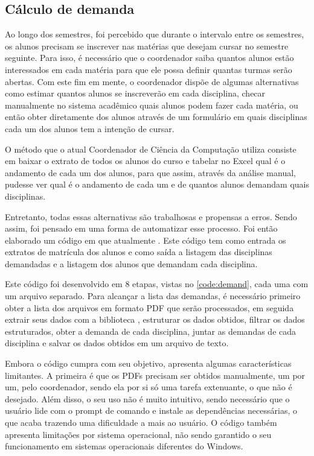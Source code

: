 \subsection{Cálculo de demanda} %

Ao longo dos semestres, foi percebido que durante o intervalo entre os semestres, os alunos precisam se inscrever nas matérias que desejam cursar no semestre seguinte. Para isso, é necessário que o coordenador saiba quantos alunos estão interessados em cada matéria para que ele possa definir quantas turmas serão abertas. Com este fim em mente, o coordenador dispõe de algumas alternativas como estimar quantos alunos se inscreverão em cada disciplina, checar manualmente no sistema acadêmico quais alunos podem fazer cada matéria, ou então obter diretamente dos alunos através de um formulário em quais disciplinas cada um dos alunos tem a intenção de cursar.

O método que o atual Coordenador de Ciência da Computação utiliza consiste em baixar o extrato de todos os alunos do curso e tabelar no Excel qual é o andamento de cada um dos alunos, para que assim, através da análise manual, pudesse ver qual é o andamento de cada um e de quantos alunos demandam quais disciplinas.

Entretanto, todas essas alternativas são trabalhosas e propensas a erros. Sendo assim, foi pensado em uma forma de automatizar esse processo. Foi então elaborado um código em  que atualmente . Este código tem como entrada os extratos de matrícula dos alunos e como saída a listagem das disciplinas demandadas e a listagem dos alunos que demandam cada disciplina.



Este código foi desenvolvido em 8 etapas, vistas no \autoref{code:demand}, cada uma com um arquivo separado. Para alcançar a lista das demandas, é necessário primeiro obter a lista dos arquivos em formato PDF que serão processados, em seguida extrair seus dados com a biblioteca , estruturar os dados obtidos, filtrar os dados estruturados, obter a demanda de cada disciplina, juntar as demandas de cada disciplina e salvar os dados obtidos em um arquivo de texto.

Embora o código cumpra com seu objetivo, apresenta algumas características limitantes. A primeira é que os PDFs precisam ser obtidos manualmente, um por um, pelo coordenador, sendo ela por si só uma tarefa extenuante, o que não é desejado. Além disso, o seu uso não é muito intuitivo, sendo necessário que o usuário lide com o prompt de comando e instale as dependências necessárias, o que acaba trazendo uma dificuldade a mais ao usuário. O código também apresenta limitações por sistema operacional, não sendo garantido o seu funcionamento em sistemas operacionais diferentes do Windows.

